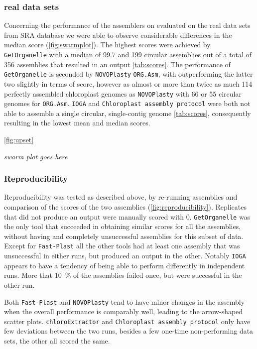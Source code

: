 \documentclass{bmcart}
\newcommand{\formatprogramnames}[1]{\texttt{#1}}
\newcommand{\ce}{\formatprogramnames{chloroExtractor}}
\newcommand{\oa}{\formatprogramnames{ORG.Asm}}
\newcommand{\fp}{\formatprogramnames{Fast-Plast}}
\newcommand{\ioga}{\formatprogramnames{IOGA}}
\newcommand{\np}{\formatprogramnames{NOVOPlasty}}
\newcommand{\go}{\formatprogramnames{GetOrganelle}}
\newcommand{\cassp}{\formatprogramnames{Chloroplast assembly protocol}}
\begin{document}
\subsubsection*{real data sets}
Concerning the performance of the assemblers on evaluated on the real data sets from SRA database we were able to observe considerable differences in the median score (\cref{fig:swarmplot}).
The highest scores were achieved by \go{} with a median of 99.7 and 199 circular assemblies out of a total of 356 assemblies that resulted in an output  \cref{tab:scores}.
The performance of \go{} is seconded by \fb{} \np{} \oa{}, with \fb{} outperforming the latter two slightly in terms of score, however \fb{} as almost or more than twice as much \num{114} perfectly assembled chloroplast genomes as \np{} with \num{66} or \num{55} circular genomes for \oa{}.
\ioga{} and \cassp{} were both not able to assemble a single circular, single-contig genome \cref{tab:scores}, consequently resulting in the lowest mean and median scores.  




\cref{fig:upset}

\textit{swarm plot goes here}


\subsubsection*{Reproducibility}
Reproducibility was tested as described above, by re-running assemblies and comparison of the scores of the two assemblies (\cref{fig:reproducibility}).
Replicates that did not produce an output were manually scored with \num{0}. 
\go{} was the only tool that succeeded in obtaining similar scores for all the assemblies, without having and completely unsuccessful assemblies for this subset of data. Except for \fp{} all the other tools had at least one assembly that was unsuccessful in either runs, but produced an output in the other.  Notably \ioga{} appears to have a tendency of being able to perform differently in independent runs. More that \SI{10}{\percent} of the assemblies failed once, but were successful in the other run.

Both \fp{} and \np{} tend to have minor changes in the assembly when the overall performance is comparably well, leading to the arrow-shaped scatter plots. \ce{} and \cassp{} only have few deviations between the two runs, besides a few one-time non-performing data sets, the other all scored the same.
\end{document}
